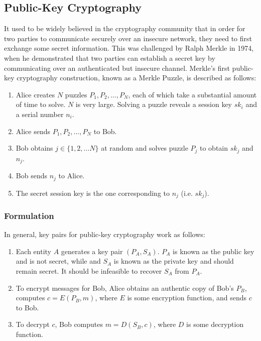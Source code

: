 \documentclass[12pt,titlepage]{article}
\begin{document}
    \subsection{Public-Key Cryptography}
      It used to be widely believed in the cryptography community that in order for two parties to communicate securely
      over an insecure network, they need to first exchange some secret information. This was challenged by Ralph Merkle
      in 1974, when he demonstrated that two parties can establish a secret key by communicating over an authenticated
      but insecure channel. Merkle's first public-key cryptography construction, known as a Merkle Puzzle, is described
      as follows:
      \begin{enumerate}
        \item Alice creates $N$ puzzles $P_1, P_2, \dots, P_N$, each of which take a substantial amount of time to solve.
          $N$ is very large. Solving a puzzle reveals a session key $sk_i$ and a serial number $n_i$.
        \item Alice sends $P_1, P_2, \dots, P_N$ to Bob.
        \item Bob obtains $j \in \{1, 2, \dots N\}$ at random and solves puzzle $P_j$ to obtain $sk_j$ and $n_j$.
        \item Bob sends $n_j$ to Alice.
        \item The secret session key is the one corresponding to $n_j$ (i.e. $sk_j$).
      \end{enumerate}

      \subsubsection{Formulation}
        In general, key pairs for public-key cryptography work as follows:
        \begin{enumerate}
          \item Each entity $A$ generates a key pair $(P_A, S_A)$. $P_A$ is known as the public key and is not secret,
            while and $S_A$ is known as the private key and should remain secret. It should be infeasible to recover
            $S_A$ from $P_A$.
          \item To encrypt messages for Bob, Alice obtains an authentic copy of Bob's $P_B$, computes $c = E(P_B, m)$,
            where $E$ is some encryption function, and sends $c$ to Bob.
          \item To decrypt $c$, Bob computes $m = D(S_B, c)$, where $D$ is some decryption function.
        \end{enumerate}
\end{document}
